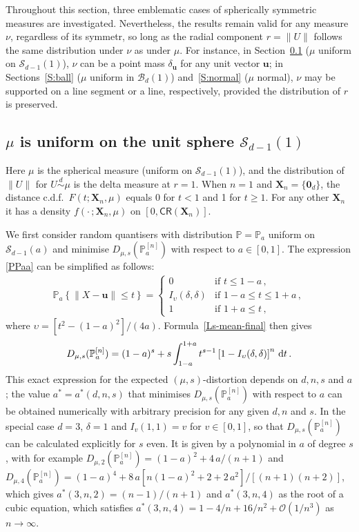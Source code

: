 \documentclass{article}
\def\Xb{\mathbf{X}}
\def\simd{\stackrel{d}{\sim}}
\def\PP{\mathbb{P}}
\def\SB{{\mathscr B}}
\def\SS{{\mathcal S}}
\def\0b{\mathbf{0}}
\newcommand{\bea}{\begin{eqnarray*}}
\newcommand{\eea}{\end{eqnarray*}}
\newcommand{\be}{\begin{eqnarray}}
\newcommand{\ee}{\end{eqnarray}}
\def\ub{\mathbf{u}}
\def\CR{\mathsf{CR}}
\def\dd{\mbox{\rm d}}
\def\SO{{\mathcal O}}
\begin{document}
Throughout this section, three emblematic cases of  spherically symmetric measures are investigated. Nevertheless, the results remain valid for any measure $\nu$, regardless of its symmetr, so long as the radial component $r=\|U\|$ follows the same distribution under $\nu$ as under $\mu$. For instance, in Section~\ref{S:sphere} ($\mu$ uniform on $\SS_{d-1}(1)$), $\nu$ can be a point mass $\delta_\ub$ for any unit vector $\ub$; in Sections~\ref{S:ball} ($\mu$ uniform in $\SB_d(1)$) and~\ref{S:normal} ($\mu$ normal), $\nu$ may be supported on a line segment or a line, respectively, provided the distribution of $r$ is preserved.

\subsection{$\mu$ is uniform on the unit sphere $\SS_{d-1}(1)$} \label{S:sphere}

Here $\mu$ is the spherical measure (uniform on $\SS_{d-1}(1)$), and the distribution of $\|U\|$ for $U\simd\mu$ is the delta measure at $r=1$. When $n=1$ and $\Xb_n=\{\0b_d\}$, the distance c.d.f.\ $F(t;\Xb_n,\mu)$ equals 0 for $t<1$ and 1 for $t\geq 1$. For any other $\Xb_n$ it has a density $f(\cdot\,;\Xb_n,\mu)$ on $[0,\CR(\Xb_n)]$.

We first consider random quantisers with distribution $\PP=\PP_a$ uniform on $\SS_{d-1}(a)$  and minimise $D_{\mu,s}(\PP^{[n]}_a)$ with respect to $a\in[0,1]$. The expression \eqref{PPaa} can be simplified as follows:
\bea %
\PP_a\left\{ \| X-\ub \| \leq t \right\} =
\left\{\begin{array}{ll}
0                      & \mbox{if } t\leq 1-a \,,\\
I_\upsilon(\delta,\delta) & \mbox{if } 1-a \leq t \leq 1+a \,, \\
1                      & \mbox{if } 1+a \leq t \,,
\end{array} \right.
\eea
where $\upsilon=[t^2 -(1-a)^2]/(4 a)$. Formula~\eqref{Ls-mean-final} then gives
\be\label{Ds-sphere}
D_{\mu,s}(\PP^{[n]}_a) =  (1-a)^s + s \int_{1-a}^{1+a} t^{s-1} \left[1-I_\upsilon(\delta,\delta)\right]^n\,\dd t \,.
\ee
This exact expression for the expected $(\mu,s)$-distortion depends on $d,n,s$ and $a$; the value $a^*=a^*(d,n,s)$ that minimises $D_{\mu,s}(\PP^{[n]}_a)$ with respect to $a$ can be obtained numerically with arbitrary precision for any given $d,n$ and $s$. In the special case $d=3$, $\delta=1$ and $I_v(1,1)=v$ for $v\in[0,1]$, so that $D_{\mu,s}(\PP^{[n]}_a)$ can be calculated explicitly for $s$ even. It is given by a polynomial in $a$ of degree $s$, with for example $D_{\mu,2}(\PP^{[n]}_a)=(1-a)^2+4\,a/(n+1)$ and $D_{\mu,4}(\PP^{[n]}_a)=(1-a)^4+8\,a[n(1-a)^2+2+2\,a^2]/[(n+1)(n+2)]$, which gives $a^*(3,n,2)=(n-1)/(n+1)$ and $a^*(3,n,4)$ as the root of a cubic equation, which satisfies $a^*(3,n,4)=1-4/n+16/n^2+\SO(1/n^3)$ as $n\to\infty$.
\end{document}
